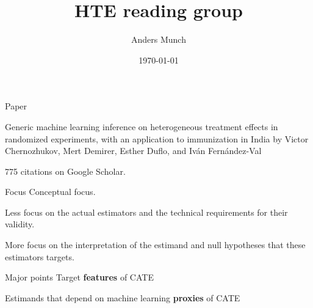 \documentclass[smaller, aspectratio=169]{beamer}
\author{Anders Munch}
\date{\today}
\title{HTE reading group}
\newcommand{\1}{\mathds{1}}
\begin{document}
\maketitle

\begin{frame}[label={sec:org3afacc4}]{Paper}
\begin{block}{Generic machine learning inference on heterogeneous treatment effects in randomized experiments, with an application to immunization in India}
by Victor Chernozhukov, Mert Demirer, Esther Duflo, and Iván
Fernández-Val

\hfill

\vfill

775 citations on Google Scholar. 
\end{block}
\end{frame}

\begin{frame}[label={sec:orgad2fa60}]{Focus}
Conceptual focus.

\vfill

Less focus on the actual estimators and the technical requirements for
their validity.

\vfill

More focus on the interpretation of the estimand and null hypotheses
that these estimators targets.
\end{frame}

\begin{frame}[label={sec:org6229ac7}]{Major points}
Target \textbf{features} of CATE

\vfill

Estimands that depend on machine learning \textbf{proxies} of CATE

\vfill

\end{frame}
\end{document}
